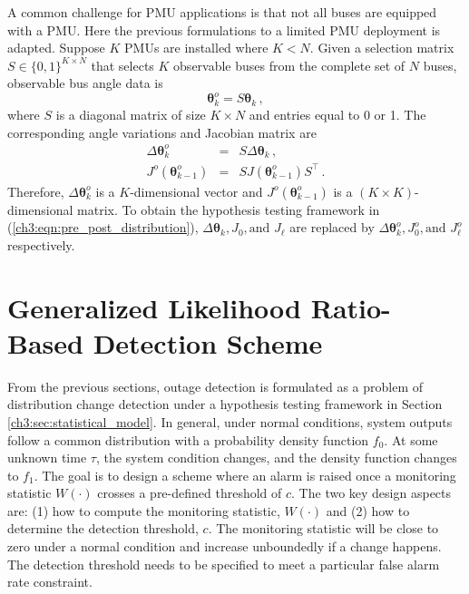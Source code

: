 A common challenge for PMU applications is that not all buses are equipped with a PMU. Here the previous formulations to a limited PMU deployment is adapted. Suppose $K$ PMUs are installed where $K < N$. Given a selection matrix ${S} \in \{ 0 ,1 \}^{K \times N}$ that selects $K$ observable buses from the complete set of $N$ buses, observable bus angle data is 
\begin{equation}
\boldsymbol{\theta}^o_k = {S} \boldsymbol{\theta}_k \,,
\end{equation} where ${S}$ is a diagonal matrix of size $K \times N$ and entries equal to 0 or 1. The corresponding angle variations and Jacobian matrix are 
\begin{eqnarray}
\Delta\boldsymbol{\theta}^o_{k} &=& {S} \Delta\boldsymbol{\theta}_k \,, \\
{J}^o(\boldsymbol{\theta}^o_{k-1}) &=& {S} {J}(\boldsymbol{\theta}^o_{k-1}) {S}^\top \,.
\end{eqnarray}
Therefore, $\Delta\boldsymbol{\theta}^o_{k}$ is a $K$-dimensional vector and ${J}^o(\boldsymbol{\theta}^o_{k-1})$ is a $(K \times K)$-dimensional matrix. To obtain the hypothesis testing framework in (\ref{ch3:eqn:pre_post_distribution}), $\Delta\boldsymbol{\theta}_k, {J}_0, \text{and } {J}_{\ell}$ are replaced by $\Delta\boldsymbol{\theta}^o_k, {J}^o_0, \text{and } {J}^o_{\ell}$ respectively. 


\section{Generalized Likelihood Ratio-Based Detection Scheme}
\label{ch3:sec:detection_scheme}
From the previous sections, outage detection is formulated as a problem of distribution change detection under a hypothesis testing framework in Section \ref{ch3:sec:statistical_model}. In general, under normal conditions, system outputs follow a common distribution with a probability density function $f_0$. At some unknown time $\tau$, the system condition changes, and the density function changes to $f_1$. The goal is to design a scheme where an alarm is raised once a monitoring statistic $W(\cdot)$ crosses a pre-defined threshold of $c$. The two key design aspects are: (1) how to compute the monitoring statistic, $W(\cdot)$ and (2) how to determine the detection threshold, $c$. The monitoring statistic will be close to zero under a normal condition and increase unboundedly if a change happens. The detection threshold needs to be specified to meet a particular false alarm rate constraint. 

